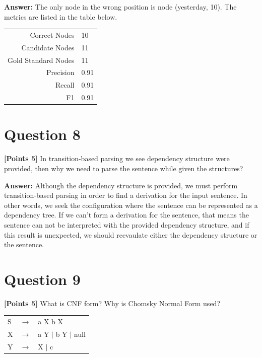 \documentclass[12pt]{article}
\begin{document}
\textbf{Answer:} The only node in the wrong position is node (yesterday, 10).
The metrics are listed in the table below.

\begin{table}[ht]
      \centering
      \begin{tabular}{rl}
            \hline
            Correct Nodes       & 10   \\
            Candidate Nodes     & 11   \\
            Gold Standard Nodes & 11   \\
            \hline
            Precision           & 0.91 \\
            Recall              & 0.91 \\
            F1                  & 0.91 \\
            \hline
      \end{tabular}
\end{table}


\newpage
\section*{Question 8}
\textbf{[Points 5]} In transition-based parsing we see dependency structure were
provided, then why we need to parse the sentence while given the structures?

\textbf{Answer:} Although the dependency structure is provided, we must perform
transition-based parsing in order to find a derivation for the input sentence.
In other words, we seek the configuration where the sentence can be represented
as a dependency tree. If we can't form a derivation for the sentence, that means
the sentence can not be interpreted with the provided dependency structure, and
if this result is unexpected, we should reevaulate either the dependency
structure or the sentence.

\newpage
\section*{Question 9}
\textbf{[Points 5]} What is CNF form? Why is Chomsky Normal Form used?

\begin{tabular}{lll}
      S & $\rightarrow$ & a X b X              \\
      X & $\rightarrow$ & a Y $|$ b Y $|$ null \\
      Y & $\rightarrow$ & X $|$ c              \\
\end{tabular}
\end{document}
